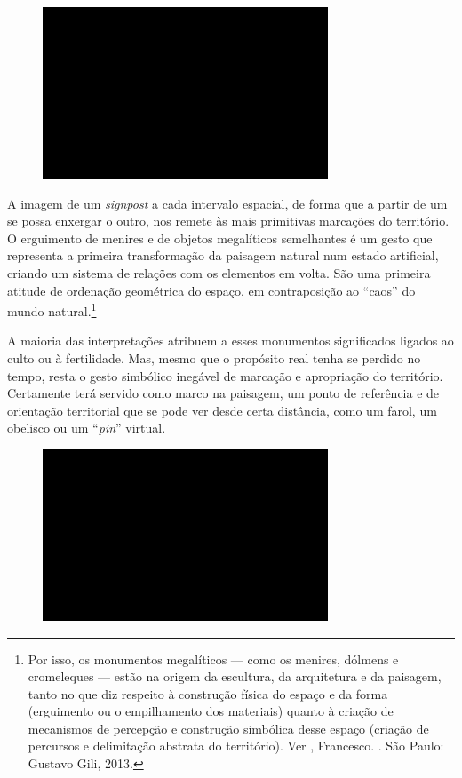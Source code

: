 \begin{figure}[!ht]

\centering
 \includegraphics[width=85mm]{./imgs/im1.jpg}
\caption{\tiny{}}

\end{figure}

A imagem de um \emph{signpost} a cada intervalo espacial, de forma que a
partir de um se possa enxergar o outro, nos remete às mais primitivas
marcações do território. O erguimento de menires e de objetos
megalíticos semelhantes é um gesto que representa a primeira
transformação da paisagem natural num estado artificial, criando um
sistema de relações com os elementos em volta. São uma primeira atitude
de ordenação geométrica do espaço, em contraposição ao ``caos'' do mundo
natural.\footnote{Por isso, os monumentos megalíticos --- como os
  menires, dólmens e cromeleques --- estão na origem da escultura, da
  arquitetura e da paisagem, tanto no que diz respeito à construção
  física do espaço e da forma (erguimento ou o empilhamento dos
  materiais) quanto à criação de mecanismos de percepção e construção
  simbólica desse espaço (criação de percursos e delimitação abstrata do
  território). Ver , Francesco. {}. São Paulo: Gustavo Gili, 2013.}

A maioria das interpretações atribuem a esses monumentos significados
ligados ao culto ou à fertilidade. Mas, mesmo que o propósito real tenha
se perdido no tempo, resta o gesto simbólico inegável de marcação e
apropriação do território. Certamente terá servido como marco na
paisagem, um ponto de referência e de orientação territorial que se pode
ver desde certa distância, como um farol, um obelisco ou um ``\emph{pin}''
virtual.

\begin{figure}[!ht]

\centering
 \includegraphics[width=85mm]{./imgs/im1.jpg}
\caption{\tiny{}}

\end{figure}

